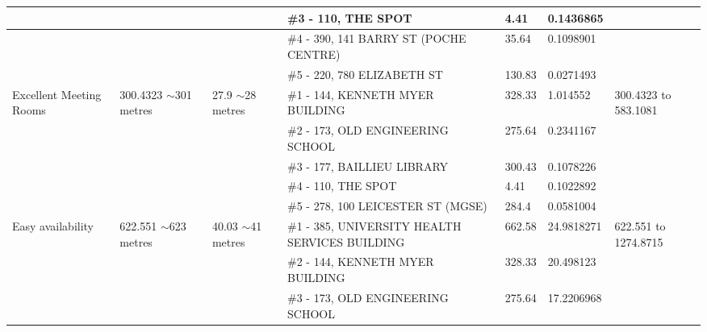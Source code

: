 \begin{table}[H]
{\begin{tabular}{|l|l|l|l|l|l|l|}
                        &                           &                          & \#3 - 110, THE SPOT                                     & 4.41          & 0.1436865       &                           \\ \hline
                        &                           &                          & \#4 - 390, 141 BARRY ST (POCHE CENTRE)                  & 35.64         & 0.1098901       &                           \\ \hline
                        &                           &                          & \#5 - 220, 780 ELIZABETH ST                             & 130.83        & 0.0271493       &                           \\ \hline
Excellent Meeting Rooms & 300.4323 $\sim$301 metres & 27.9 $\sim$28 metres     & \#1 - 144, KENNETH MYER BUILDING                        & 328.33        & 1.014552        & 300.4323 to 583.1081      \\ \hline
                        &                           &                          & \#2 - 173, OLD ENGINEERING SCHOOL                       & 275.64        & 0.2341167       &                           \\ \hline
                        &                           &                          & \#3 - 177, BAILLIEU LIBRARY                             & 300.43        & 0.1078226       &                           \\ \hline
                        &                           &                          & \#4 - 110, THE SPOT                                     & 4.41          & 0.1022892       &                           \\ \hline
                        &                           &                          & \#5 - 278, 100 LEICESTER ST (MGSE)                      & 284.4         & 0.0581004       &                           \\ \hline
Easy availability       & 622.551 $\sim$623 metres  & 40.03 $\sim$41 metres    & \#1 - 385, UNIVERSITY HEALTH SERVICES BUILDING          & 662.58        & 24.9818271      & 622.551 to 1274.8715      \\ \hline
                        &                           &                          & \#2 - 144, KENNETH MYER BUILDING                        & 328.33        & 20.498123       &                           \\ \hline
                        &                           &                          & \#3 - 173, OLD ENGINEERING SCHOOL                       & 275.64        & 17.2206968      &                           \\ \hline

\end{tabular}}
\end{table}
